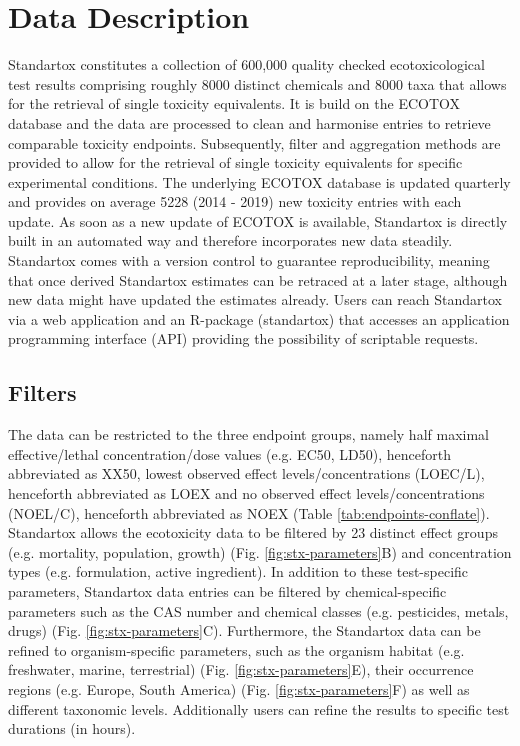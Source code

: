 \section{Data Description}
Standartox constitutes a collection of 600,000 quality checked ecotoxicological test results comprising roughly 8000 distinct chemicals and 8000 taxa that allows for the retrieval of single toxicity equivalents. It is build on the ECOTOX database \citep{usepa_ecotox_2019} and the data are processed to clean and harmonise entries to retrieve comparable toxicity endpoints. Subsequently, filter and aggregation methods are provided to allow for the retrieval of single toxicity equivalents for specific experimental conditions. The underlying ECOTOX database is updated quarterly and provides on average 5228 (2014 - 2019) new toxicity entries with each update. As soon as a new update of ECOTOX is available, Standartox is directly built in an automated way and therefore incorporates new data steadily. Standartox comes with a version control to guarantee reproducibility, meaning that once derived Standartox estimates can be retraced at a later stage, although new data might have updated the estimates already. Users can reach Standartox via a web application and an R-package (standartox) that accesses an application programming interface (API) providing the possibility of scriptable requests.

\subsection{Filters}
The data can be restricted to the three endpoint groups, namely half maximal effective/lethal concentration/dose values (e.g. EC50, LD50), henceforth abbreviated as XX50, lowest observed effect levels/concentrations (LOEC/L), henceforth abbreviated as LOEX and no observed effect levels/concentrations (NOEL/C), henceforth abbreviated as NOEX (Table \ref{tab:endpoints-conflate}). Standartox allows the ecotoxicity data to be filtered by 23 distinct effect groups (e.g. mortality, population, growth) (Fig. \ref{fig:stx-parameters}B) and concentration types (e.g. formulation, active ingredient). In addition to these test-specific parameters, Standartox data entries can be filtered by chemical-specific parameters such as the CAS number and chemical classes (e.g. pesticides, metals, drugs) (Fig. \ref{fig:stx-parameters}C). Furthermore, the Standartox data can be refined to organism-specific parameters, such as the organism habitat (e.g. freshwater, marine, terrestrial) (Fig. \ref{fig:stx-parameters}E), their occurrence regions (e.g. Europe, South America) (Fig. \ref{fig:stx-parameters}F) as well as different taxonomic levels. Additionally users can refine the results to specific test durations (in hours).

